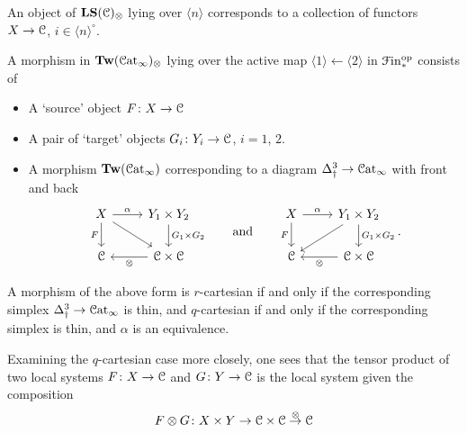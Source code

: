 \documentclass[main.tex]{subfiles}
\begin{document}
\begin{example}
  An object of $\mathbf{LS}(\mathcal{C})_{\otimes}$ lying over $\langle n \rangle$ corresponds to a collection of functors $X \to \mathcal{C}$, $i \in \langle n \rangle^{\circ}$.
\end{example}

\begin{example}
  A morphism in $\mathbf{Tw}(\mathcal{C}\mathrm{at}_{\infty})_{\otimes}$ lying over the active map $\langle 1 \rangle \leftarrow \langle 2 \rangle$ in $\mathcal{F}\mathrm{in}_{*}^{\mathrm{op}}$ consists of
  \begin{itemize}
    \item A `source' object $F\colon X \to \mathcal{C}$

    \item A pair of `target' objects $G_{i}\colon Y_{i} \to \mathcal{C}$, $i = 1$, $2$.

    \item A morphism $\mathbf{Tw}(\mathcal{C}\mathrm{at}_{\infty})$ corresponding to a diagram $\Delta^{3}_{\dagger} \to \mathcal{C}\mathrm{at}_{\infty}$ with front and back
      \begin{equation*}
        \begin{tikzcd}
          X
          \arrow[r, "\alpha"]
          \arrow[d, ""{name=L, right}, "F"{left}]
          \arrow[dr]
          & Y_{1} \times Y_{2}
          \arrow[d, ""{name=R, left}, "G_{1} \times G_{2}"{right}]
          \\
          \category{C}
          & \category{C} \times \category{C}
          \arrow[l, "\otimes"]
        \end{tikzcd}
        \qquad\text{and}\qquad
        \begin{tikzcd}
          X
          \arrow[r, "\alpha"]
          \arrow[d, ""{name=L, right}, "F"{left}]
          & Y_{1} \times Y_{2}
          \arrow[d, ""{name=R, left}, "G_{1} \times G_{2}"{right}]
          \arrow[dl]
          \\
          \category{C}
          & \category{C} \times \category{C}
          \arrow[l, "\otimes"]
        \end{tikzcd}.
      \end{equation*}
  \end{itemize}

  A morphism of the above form is $r$-cartesian if and only if the corresponding simplex $\Delta^{3}_{\dagger} \to \mathcal{C}\mathrm{at}_{\infty}$ is thin, and $q$-cartesian if and only if the corresponding simplex is thin, and $\alpha$ is an equivalence.
\end{example}

\begin{example}
  Examining the $q$-cartesian case more closely, one sees that the tensor product of two local systems $F\colon X \to \mathcal{C}$ and $G\colon Y \to \mathcal{C}$ is the local system given the composition
  \begin{equation*}
    F \otimes G\colon X \times Y \to \mathcal{C} \times \mathcal{C} \overset{\otimes}{\to} \mathcal{C}
  \end{equation*}
\end{example}
\end{document}
